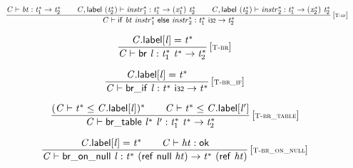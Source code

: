 $$
\begin{array}{@{}c@{}}\displaystyle
\frac{
{\mathit{C}} \vdash {\mathit{bt}} : {{\mathit{t}}_{{1}}^\ast} \rightarrow {{\mathit{t}}_{{2}}^\ast}
 \qquad
{\mathit{C}}, \mathsf{label}~({{\mathit{t}}_{{2}}^\ast}) \vdash {{\mathit{instr}}_{{1}}^\ast} : {{\mathit{t}}_{{1}}^\ast} \rightarrow ({{\mathit{x}}_{{1}}^\ast})~{{\mathit{t}}_{{2}}^\ast}
 \qquad
{\mathit{C}}, \mathsf{label}~({{\mathit{t}}_{{2}}^\ast}) \vdash {{\mathit{instr}}_{{2}}^\ast} : {{\mathit{t}}_{{1}}^\ast} \rightarrow ({{\mathit{x}}_{{2}}^\ast})~{{\mathit{t}}_{{2}}^\ast}
}{
{\mathit{C}} \vdash \mathsf{if}~{\mathit{bt}}~{{\mathit{instr}}_{{1}}^\ast}~\mathsf{else}~{{\mathit{instr}}_{{2}}^\ast} : {{\mathit{t}}_{{1}}^\ast}~\mathsf{i{\scriptstyle32}} \rightarrow {{\mathit{t}}_{{2}}^\ast}
} \, {[\textsc{\scriptsize T{-}if}]}
\qquad
\end{array}
$$

\vspace{1ex}

$$
\begin{array}{@{}c@{}}\displaystyle
\frac{
{\mathit{C}}.\mathsf{label}[{\mathit{l}}] = {{\mathit{t}}^\ast}
}{
{\mathit{C}} \vdash \mathsf{br}~{\mathit{l}} : {{\mathit{t}}_{{1}}^\ast}~{{\mathit{t}}^\ast} \rightarrow {{\mathit{t}}_{{2}}^\ast}
} \, {[\textsc{\scriptsize T{-}br}]}
\qquad
\end{array}
$$

$$
\begin{array}{@{}c@{}}\displaystyle
\frac{
{\mathit{C}}.\mathsf{label}[{\mathit{l}}] = {{\mathit{t}}^\ast}
}{
{\mathit{C}} \vdash \mathsf{br\_if}~{\mathit{l}} : {{\mathit{t}}^\ast}~\mathsf{i{\scriptstyle32}} \rightarrow {{\mathit{t}}^\ast}
} \, {[\textsc{\scriptsize T{-}br\_if}]}
\qquad
\end{array}
$$

$$
\begin{array}{@{}c@{}}\displaystyle
\frac{
({\mathit{C}} \vdash {{\mathit{t}}^\ast} \leq {\mathit{C}}.\mathsf{label}[{\mathit{l}}])^\ast
 \qquad
{\mathit{C}} \vdash {{\mathit{t}}^\ast} \leq {\mathit{C}}.\mathsf{label}[{\mathit{l}'}]
}{
{\mathit{C}} \vdash \mathsf{br\_table}~{{\mathit{l}}^\ast}~{\mathit{l}'} : {{\mathit{t}}_{{1}}^\ast}~{{\mathit{t}}^\ast} \rightarrow {{\mathit{t}}_{{2}}^\ast}
} \, {[\textsc{\scriptsize T{-}br\_table}]}
\qquad
\end{array}
$$

$$
\begin{array}{@{}c@{}}\displaystyle
\frac{
{\mathit{C}}.\mathsf{label}[{\mathit{l}}] = {{\mathit{t}}^\ast}
 \qquad
{\mathit{C}} \vdash {\mathit{ht}} : \mathsf{ok}
}{
{\mathit{C}} \vdash \mathsf{br\_on\_null}~{\mathit{l}} : {{\mathit{t}}^\ast}~(\mathsf{ref}~\mathsf{null}~{\mathit{ht}}) \rightarrow {{\mathit{t}}^\ast}~(\mathsf{ref}~{\mathit{ht}})
} \, {[\textsc{\scriptsize T{-}br\_on\_null}]}
\qquad
\end{array}
$$

